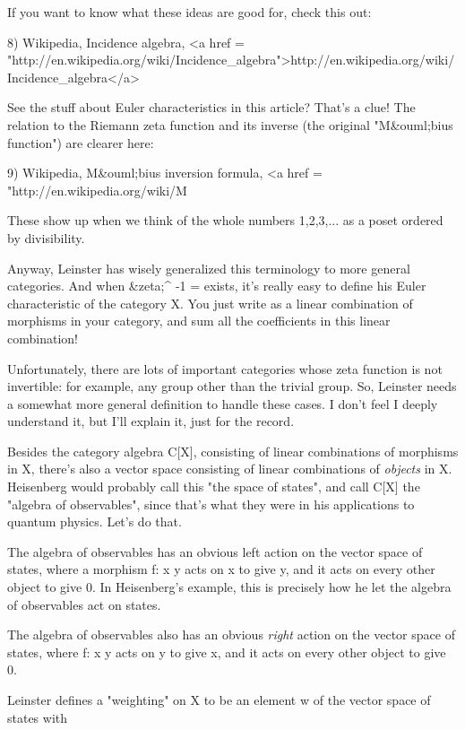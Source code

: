 If you want to know what these ideas are good for, check this out:

8) Wikipedia, Incidence algebra, 
<a href = "http://en.wikipedia.org/wiki/Incidence_algebra">http://en.wikipedia.org/wiki/Incidence_algebra</a>

See the stuff about Euler characteristics in this article?  That's a 
clue!  The relation to the Riemann zeta function and its inverse
(the original "M&ouml;bius function") are clearer here:

9) Wikipedia, M&ouml;bius inversion formula,
<a href = "http://en.wikipedia.org/wiki/M%

These show up when we think of the whole numbers 1,2,3,... as a poset 
ordered by divisibility.

Anyway, Leinster has wisely generalized this terminology to more
general categories.  And when &zeta;^{ -1} = \mu  exists, it's
really easy to define his Euler characteristic of the category X.  You
just write \mu  as a linear combination of morphisms in your category,
and sum all the coefficients in this linear combination!

Unfortunately, there are lots of important categories whose zeta
function is not invertible: for example, any group other than the
trivial group.  So, Leinster needs a somewhat more general definition
to handle these cases.  I don't feel I deeply understand it, but I'll
explain it, just for the record.

Besides the category algebra C[X], consisting of linear combinations
of morphisms in X, there's also a vector space consisting of linear
combinations of \emph{objects} in X.  Heisenberg would probably call
this "the space of states", and call C[X] the "algebra
of observables", since that's what they were in his applications
to quantum physics.  Let's do that.

The algebra of observables has an obvious left action on the vector 
space of states, where a morphism f: x \to  y acts on x to give y, and 
it acts on every other object to give 0.  In Heisenberg's example, 
this is precisely how he let the algebra of observables act on states.

The algebra of observables also has an obvious \emph{right} action
on the vector space of states, where f: x \to  y acts on y to give
x, and it acts on every other object to give 0.

Leinster defines a "weighting" on X to be an element w of
the vector space of states with

